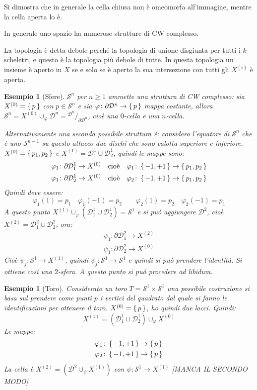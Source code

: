 \documentclass[10pt, twoside=false, x11names]{scrbook}
\newtheorem{example}[theorem]{Esempio}
\newcommand{\Sph}[1][]{\mathcal{S}^#1}
\newcommand{\Disk}[1][]{\mathcal{D}^#1}
\newcommand*\quot[2]{{^{\textstyle #1}\big/_{\textstyle #2}}}
\let\phi\varphi
\begin{document}
Si dimostra che in generale la cella chiusa non è omeomorfa all'immagine, mentre la cella
aperta lo è.

In generale uno spazio ha numerose strutture di CW complesso.

La topologia è detta debole perché la topologia di unione disgiunta per tutti i $ k $-scheletri,
e questo è la topologia più debole di tutte. In questa topologia un insieme è aperto in $ X $
se e solo se è aperto la sua intersezione con tutti gli $ X^{(i)} $ è aperta.

\begin{example}[Sfere]
  $ \Sph{n} $ per $ n \geq 1 $ ammette una struttura di CW complesso: sia $ X^{(0)} = \set{p} $ con
  $ p \in \Sph{n} $ e sia $ \phi \colon \partial \Disk{n} \to \set{p} $ mappa costante, allora
  $ \Sph{n} = X^{(0)} \cup_\phi \Disk{n} = \quot{\Disk{n}}{\partial \Disk{n}} $, cioè una $ 0 $-cella e una
  $ n $-cella.

  Alternativamente una seconda possibile struttura è: considero l'equatore di $ \Sph{n} $ che
  è uno $ \Sph{n-1} $ su questo attacco due dischi che sono calotta superiore e inferiore.
  $ X^{(0)} = \set{p_1, p_2} $ e $ X^{(1)} = \Disk{1}_1 \cup \Disk{1}_2 $, quindi le mappe
  sono:
  \begin{gather*}
    \phi_1 \colon \partial \Disk{1}_1 \to X^{(0)} \quad \text{cioè} \quad \phi_1 \colon \set{-1, +1} \to \set{p_1, p_2} \\
    \phi_1 \colon \partial \Disk{1}_2 \to X^{(0)} \quad \text{cioè} \quad \phi_2 \colon \set{-1, +1} \to \set{p_1, p_2}
  \end{gather*}
  Quindi deve essere:
  \[
    \phi_1(1) = p_1 \quad \phi_1(-1) = p_2 \qquad  \phi_2(1) = p_2 \quad \phi_2(-1) = p_1
  \]
  A questo punto $ X^{(1)} \cup_\phi (\Disk{1}_1 \cup \Disk{1}_2) = \Sph{1} $ e si può aggiungere
  $ \Disk{2} $, cioè $ X^{(2)} = \Disk{2}_1 \cup \Disk{2}_2 $, ora:
  \begin{gather*}
    \psi_1 \colon \partial \Disk{2}_1 \to X^{(2)} \\
    \psi_1 \colon \partial \Disk{2}_2 \to X^{(0)}
  \end{gather*}
  Cioè $ \psi_j \colon \Sph{1} \to X^{(1)} $, quindi $ \psi_j \colon \Sph{1} \to \Sph{1} $ e quindi si può prendere
  l'identità. Si ottiene così una $ 2 $-sfera. A questo punto si può procedere ad libidum.
\end{example}

\begin{example}[Toro]
  Considerato un toro $ T = \Sph{1} \times \Sph{1} $ una possibile costruzione si basa sul prendere
  come punti $ p $ i vertici del quadrato dal quale si fanno le identificazioni per ottenere il
  toro. $ X^{(0)} = \set{p} $, ho quindi due lacci. Quindi:
  \[
    X^{(1)} = (\Disk{1}_1 \cup \Disk{1}_2) \cup_\phi X^{(0)}
  \]
  Le mappe:
  \begin{gather*}
    \phi_1 \colon \set{-1, +1} \to \set{p} \\
    \phi_2 \colon \set{-1, +1} \to \set{p}
  \end{gather*}
  La cella è $ X^{(2)} = (\Disk{2} \cup_\psi X^{(1)}) $ con $ \psi \colon \Sph{1} \to X^{(1)} $
  [MANCA IL SECONDO MODO]
\end{example}
\end{document}
